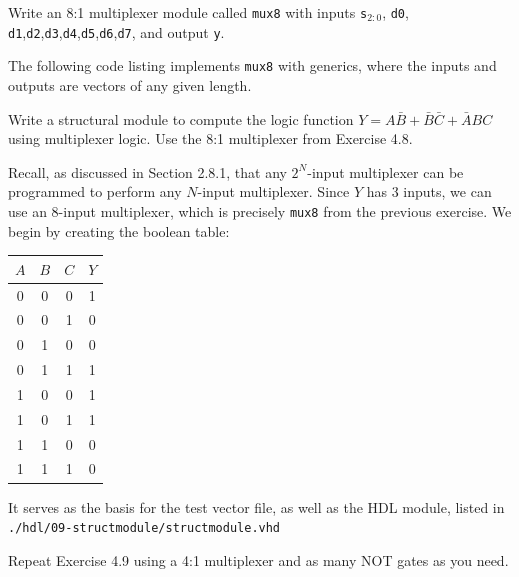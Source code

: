 \documentclass[12pt]{article}
\newenvironment{ex}[2][Exercise]{\begin{trivlist}
		\item[\hskip \labelsep {\bfseries #1}\hskip \labelsep {\bfseries #2.}]}{\end{trivlist}}
\newenvironment{sol}[1][Solution]{\begin{trivlist}
		\item[\hskip \labelsep {\bfseries #1:}]}{\end{trivlist}}
\begin{document}
\begin{ex}{4.8}
	Write an 8:1 multiplexer module called \texttt{mux8} with inputs \texttt{s$_{2:0}$}, \texttt{d0},
	\texttt{d1},\texttt{d2},\texttt{d3},\texttt{d4},\texttt{d5},\texttt{d6},\texttt{d7}, and output
	\texttt{y}.
\end{ex}

\begin{sol}
	The following code listing implements \texttt{mux8} with generics,
	where the inputs and outputs are vectors of any given length.
	
\end{sol}

\begin{ex}{4.9}
	Write a structural module to compute the logic function
	$Y=A\bar{B}+\bar{B}\bar{C}+\bar{A}BC$ using multiplexer logic.
	Use the 8:1 multiplexer from Exercise 4.8.
\end{ex}

\begin{sol}
	Recall, as discussed in Section 2.8.1, that any $2^{N}$-input
	multiplexer can be programmed to perform any $N$-input multiplexer.
	Since $Y$ has 3 inputs, we can use an 8-input multiplexer, which
	is precisely \texttt{mux8} from the previous exercise.
	We begin by creating the boolean table:
	\begin{center}
		\begin{tabular}{ccc|c}
			$A$ & $B$ & $C$ & $Y$\\
			\hline
			0 & 0 & 0 & 1\\
			0 & 0 & 1 & 0\\
			0 & 1 & 0 & 0\\
			0 & 1 & 1 & 1\\
			1 & 0 & 0 & 1\\
			1 & 0 & 1 & 1\\
			1 & 1 & 0 & 0\\
			1 & 1 & 1 & 0
		\end{tabular}
	\end{center}
	It serves as the basis for the test vector file, as well as
	the HDL module, listed in \texttt{./hdl/09-structmodule/structmodule.vhd}
	
\end{sol}

\begin{ex}{4.10}
	Repeat Exercise 4.9 using a 4:1 multiplexer and as many NOT gates
	as you need.
\end{ex}
\end{document}
